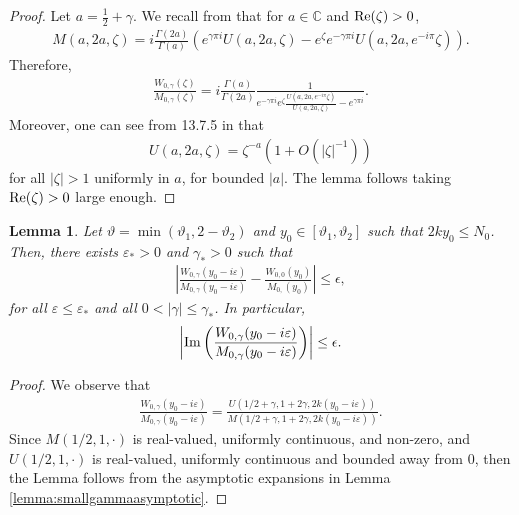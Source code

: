 \documentclass[11pt,reqno]{amsproc}
\newtheorem{lemma}[proposition]{Lemma}
\theoremstyle{definition}
\numberwithin{equation}{section}
\newcommand{\C}{{\mathbb C}}
\newcommand{\ep}{\varepsilon}
\def\Re{{\rm Re}}
\def\Im{{\rm Im}}
\begin{document}
\begin{proof}
Let $a=\frac12+\gamma$. We recall from \cite{NIST} that for $a\in \C$ and $\Re(\zeta)>0$,
\begin{align*}
M(a,2a,\zeta) = i\frac{\Gamma(2a)}{\Gamma(a)} \left( e^{\gamma\pi i}U(a,2a,\zeta) - e^\zeta e^{-\gamma\pi i}U(a,2a,e^{-i\pi}\zeta) \right). 
\end{align*}
Therefore,
\begin{align*}
\frac{W_{0,\gamma}(\zeta)}{M_{0,\gamma}(\zeta)} = i\frac{\Gamma(a)}{\Gamma(2a)}\frac{1}{e^{-\gamma\pi i} e^\zeta \frac{U(a,2a,e^{-i\pi}\zeta)}{U(a,2a,\zeta)} - e^{\gamma\pi i}}.
\end{align*}
Moreover, one can see from 13.7.5 in \cite{NIST} that
\begin{align*}
U(a,2a,\zeta) = \zeta^{-a}\left( 1 + O\left( |\zeta|^{-1}\right) \right)
\end{align*}
for all $|\zeta|>1$ uniformly in $a$, for bounded $|a|$. The lemma follows taking $\Re(\zeta)>0$ large enough.
\end{proof}

\begin{lemma}\label{lemma:smallnuboundedarg}
Let $\vartheta = \min(\vartheta_1, 2-\vartheta_2)$ and $y_0\in [\vartheta_1, \vartheta_2]$  such that $2k y_0\leq N_0$. Then, there exists $\ep_*>0$ and $\gamma_*>0$ such that 
\begin{align}
\left| \frac{W_{0,\gamma}(y_0-i\ep)}{M_{0,\gamma}(y_0-i\ep)} - \frac{W_{0,0}(y_0)}{M_{0,}(y_0)} \right| \leq \epsilon,
\end{align}
for all $\ep\leq \ep_*$ and all $0<|\gamma|\leq \gamma_*$. In particular, 
\begin{align*}
\left| \Im \left( \frac{W_{0,\gamma}(y_0-i\ep)}{M_{0,\gamma}(y_0-i\ep)} \right) \right| \leq \epsilon.
\end{align*}
\end{lemma}
\begin{proof}
We observe that
\begin{align*}
\frac{W_{0,\gamma}(y_0-i\ep)}{M_{0,\gamma}(y_0-i\ep)} = \frac{U(1/2+\gamma,1+2\gamma,2k(y_0-i\ep))}{M(1/2+\gamma,1+2\gamma,2k(y_0-i\ep))}.
\end{align*}
Since $M(1/2,1,\cdot)$ is real-valued, uniformly continuous, and non-zero, and $U(1/2,1,\cdot)$ is real-valued, uniformly continuous and bounded away from 0,  then the Lemma follows from the asymptotic expansions in Lemma \ref{lemma:smallgammaasymptotic}.
\end{proof}
\end{document}
